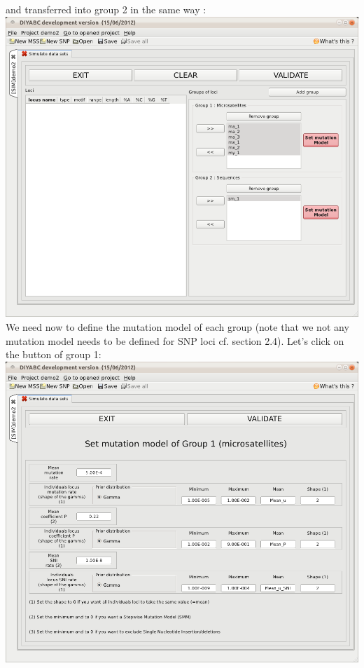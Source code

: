 and transferred into group 2 in the same way :\\


\includegraphics[scale=0.33]{gui_pictures/Capture-DIYABC-79} \\


We need now to define the mutation model of each group (note that
we not any mutation model needs to be defined for SNP loci cf. section
2.4). Let's click on the  button
of group 1:\\


\includegraphics[scale=0.33]{gui_pictures/Capture-DIYABC-80} \\


